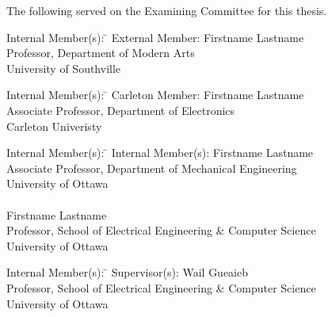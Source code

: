 \noindent
The following served on the Examining Committee for this thesis.
\bigskip

\noindent
\begin{tabbing}
  Internal Member(s): \=  \kill %
  External Member: \>  Firstname Lastname\\ %
  \> Professor, Department of Modern Arts\\
  \> University of Southville\\
\end{tabbing} 
\bigskip

\noindent
\begin{tabbing}
  Internal Member(s): \=  \kill %
  Carleton Member: \> Firstname Lastname\\
  \> Associate Professor, Department of Electronics\\
  \> Carleton Univeristy\\
\end{tabbing}
\bigskip

\noindent
\begin{tabbing}
  Internal Member(s): \=  \kill %
  Internal Member(s): \> Firstname Lastname\\
  \> Associate Professor, Department of Mechanical Engineering\\
  \> University of Ottawa\\
  \\
  \> Firstname Lastname\\
  \> Professor, School of Electrical Engineering \& Computer Science\\
  \> University of Ottawa\\
\end{tabbing}
\bigskip

\noindent
\begin{tabbing}
  Internal Member(s): \=  \kill %
  Supervisor(s): \> Wail Gueaieb \\
  \> Professor, School of Electrical Engineering \& Computer Science\\
  \> University of Ottawa \\
\end{tabbing}
\bigskip





